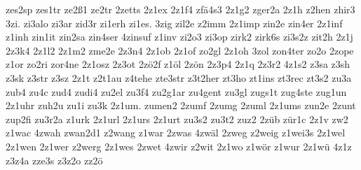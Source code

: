 {zes2sp
zes1tr
ze2ß1
ze2tr
2zetts
2z1ex
2z1f4
zfä4s3
2z1g2
zger2a
2z1h
z2hen
zhir3
3zi.
zi3alo
zi3ar
zid3r
zi1erh
zi1es.
3zig
zil2e
z2imm
2z1imp
zin2e
zin4er
2z1inf
z1inh
zin1it
zin2sa
zin4ser
4zinsuf
z1inv
zi2o3
zi3op
zirk2
zirk6s
zi3s2z
zit2h
2z1j
2z3k4
2z1l2
2z1m2
zme2e
2z3n4
2z1ob
2z1of
zo2gl
2z1oh
3zol
zon4ter
zo2o
2zope
z1or
zo2ri
zor4ne
2z1osz
2z3ot
2zö2f
z1öl
2zön
2z3p4
2z1q
2z3r2
4z1s2
z3sa
z3sh
z3sk
z3str
z3sz
2z1t
z2t1au
z4tehe
zte3str
z3t2her
zt3ho
zt1ins
zt3rec
zt3s2
zu3a
zub4
zu4c
zud4
zudi4
zu2el
zu3f4
zu2g1ar
zu4gent
zu3gl
zugs1t
zug4ste
zug1un
2z1uhr
zuh2u
zu1i
zu3k
2z1um.
zumen2
2zumf
2zumg
2zuml
2z1ums
zun2e
2zunt
zup2fi
zu3r2a
z1urk
2z1url
2z1urs
2z1urt
zu3s2
zu3t2
zuz2
2züb
zür1c
2z1v
zw2
z1wac
4zwah
zwan2d1
z2wang
z1war
2zwas
4zwäl
2zweg
z2weig
z1wei3s
2z1wel
2z1wen
2z1wer
z2werg
2z1wes
2zwet
4zwir
z2wit
2z1wo
z1wör
z1wur
2z1wü
4z1z
z3z4a
zze3s
z3z2o
zz2ö
}

\endinput

